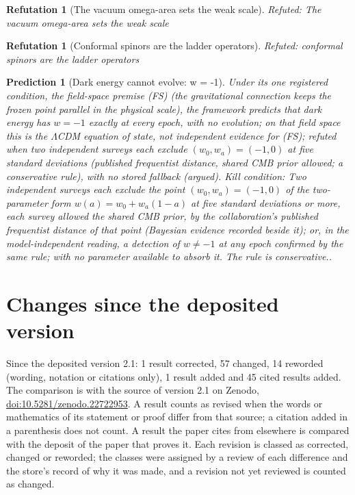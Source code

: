 \documentclass[11pt]{article}
\newtheorem{refutation}[theorem]{Refutation}
\newtheorem{prediction}[theorem]{Prediction}
\theoremstyle{definition}
\theoremstyle{plain}
\begin{document}
\begin{refutation}[The vacuum omega-area sets the weak scale]\label{c:refuted.the-vacuum-omega-area-sets-the-weak-scale}
Refuted: The vacuum omega-area sets the weak scale
\end{refutation}

\begin{refutation}[Conformal spinors are the ladder operators]\label{c:refuted.twistors-are-the-ladder-operators}
Refuted: conformal spinors are the ladder operators
\end{refutation}

\begin{prediction}[Dark energy cannot evolve: w = -1]\label{c:pred.dark-energy-w-minus-one}
Under its one registered condition, the field-space premise (FS) (the gravitational connection keeps the frozen point parallel in the physical scale), the framework predicts that dark energy has $w = -1$ exactly at every epoch, with no evolution; on that field space this is the $\Lambda$CDM equation of state, not independent evidence for (FS); refuted when two independent surveys each exclude $(w_{0}, w_{a}) = (-1, 0)$ at five standard deviations (published frequentist distance, shared CMB prior allowed; a conservative rule), with no stored fallback (argued).
\emph{Kill condition:} Two independent surveys each exclude the point $(w_0, w_a) = (-1, 0)$ of the two-parameter form $w(a) = w_0 + w_a(1 - a)$ at five standard deviations or more, each survey allowed the shared CMB prior, by the collaboration's published frequentist distance of that point (Bayesian evidence recorded beside it); or, in the model-independent reading, a detection of $w \neq -1$ at any epoch confirmed by the same rule; with no parameter available to absorb it. The rule is conservative..
\end{prediction}

\section*{Changes since the deposited version}
Since the deposited version 2.1: 1 result corrected, 57 changed, 14 reworded (wording, notation or citations only), 1 result added and 45 cited results added. The comparison is with the source of version 2.1 on Zenodo, \href{https://doi.org/10.5281/zenodo.22722953}{doi:10.5281/zenodo.22722953}. A result counts as revised when the words or mathematics of its statement or proof differ from that source; a citation added in a parenthesis does not count. A result the paper cites from elsewhere is compared with the deposit of the paper that proves it. Each revision is classed as corrected, changed or reworded; the classes were assigned by a review of each difference and the store's record of why it was made, and a revision not yet reviewed is counted as changed.
\end{document}
